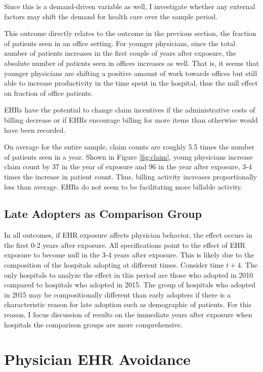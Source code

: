 \documentclass[11pt]{article}
\begin{document}
Since this is a demand-driven variable as well, I investigate whether any external factors may shift the demand for health care over the sample period. 

This outcome directly relates to the outcome in the previous section, the fraction of patients seen in an office setting. For younger physicians, since the total number of patients increases in the first couple of years after exposure, the absolute number of patients seen in offices increases as well. That is, it seems that younger physicians are shifting a positive amount of work towards offices but still able to increase productivity in the time spent in the hospital, thus the null effect on fraction of office patients. 

EHRs have the potential to change claim incentives if the administrative costs of billing decrease or if EHRs encourage billing for more items than otherwise would have been recorded. 

On average for the entire sample, claim counts are roughly 5.5 times the number of patients seen in a year. Shown in Figure \ref{fig:claim}, young physicians increase claim count by 37 in the year of exposure and 96 in the year after exposure, 3-4 times the increase in patient count. Thus, billing activity increases proportionally less than average. EHRs do not seem to be facilitating more billable activity. 


\subsection{Late Adopters as Comparison Group}

In all outcomes, if EHR exposure affects physician behavior, the effect occurs in the first 0-2 years after exposure. All specifications point to the effect of EHR exposure to become null in the 3-4 years after exposure. This is likely due to the composition of the hospitals adopting at different times. Consider time $t+4$. The only hospitals to analyze the effect in this period are those who adopted in 2010 compared to hospitals who adopted in 2015. The group of hospitals who adopted in 2015 may be compositionally different than early adopters if there is a characteristic reason for late adoption such as demographic of patients. For this reason, I focus discussion of results on the immediate years after exposure when hospitals the comparison groups are more comprehensive. 


\section{Physician EHR Avoidance}
\end{document}
